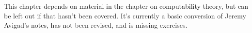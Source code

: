 \documentclass[../../../include/open-logic-chapter]{subfiles}
\begin{document}
\begin{editorial}
  This chapter depends on material in the chapter on computability
  theory, but can be left out if that hasn't been covered.  It's
  currently a basic conversion of Jeremy Avigad's notes, has not been
  revised, and is missing exercises.
\end{editorial}












\OLEndChapterHook
\end{document}
